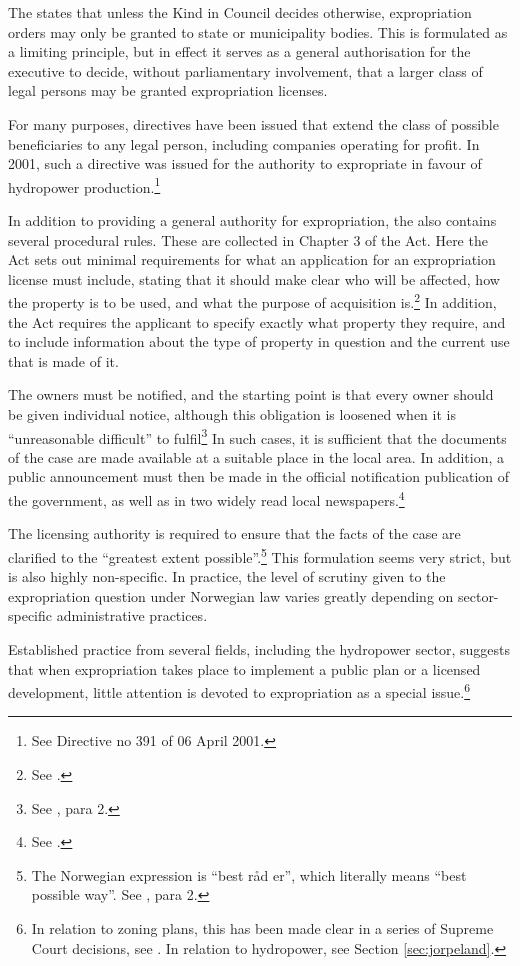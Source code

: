 The \cite{ea59} states that unless the Kind in Council decides otherwise, expropriation orders may only be granted to state or municipality bodies. This is formulated as a limiting principle, but in effect it serves as a general authorisation for the executive to decide, without parliamentary involvement, that a larger class of legal persons may be granted expropriation licenses. 

For many purposes, directives have been issued that extend the class of possible beneficiaries to any legal person, including companies operating for profit. In 2001, such a directive was issued for the authority to expropriate in favour of hydropower production.\footnote{See Directive no 391 of 06 April 2001.} 

In addition to providing a general authority for expropriation, the \cite{ea59} also contains several procedural rules. These are collected in Chapter 3 of the Act. Here the Act sets out minimal requirements for what an application for an expropriation license must include, stating that it should make clear who will be affected, how the property is to be used, and what the purpose of acquisition is.\footnote{See \cite[11]{ea59}.} In addition, the Act requires the applicant to specify exactly what property they require, and to include information about the type of property in question and the current use that is made of it.

The owners must be notified, and the starting point is that every owner should be given individual notice, although this obligation is loosened when it is ``unreasonable difficult'' to fulfil\footnote{See \cite[12]{ea59}, para 2.} In such cases, it is sufficient that the documents of the case are made available at a suitable place in the local area. In addition, a public announcement must then  be made in the official notification publication of the government, as well as in two widely read local newspapers.\footnote{See \cite[12]{ea59}.}

The licensing authority is required to ensure that the facts of the case are clarified to the ``greatest extent possible''.\footnote{The Norwegian expression is ``best råd er'', which literally means ``best possible way''. See \cite[12]{ea59}, para 2.} This formulation seems very strict, but is also highly non-specific. In practice, the level of scrutiny given to the expropriation question under Norwegian law varies greatly depending on sector-specific administrative practices.  

Established practice from several fields, including the hydropower sector, suggests that when expropriation takes place to implement a public plan or a licensed development, little attention is devoted to expropriation as a special issue.\footnote{In relation to zoning plans, this has been made clear in a series of Supreme Court decisions, see \cite{namsos98,bo99}. In relation to hydropower, see Section \ref{sec:jorpeland}.}

